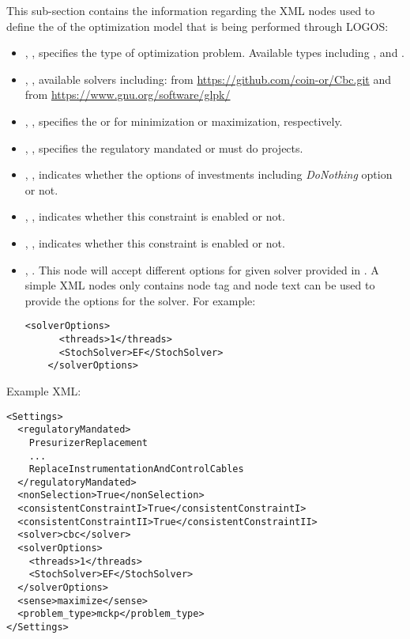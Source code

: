 This sub-section contains the information regarding the XML nodes used to define the
 of the optimization model that is being performed through LOGOS:
\begin{itemize}
  \item {}, , specifies the type of
  optimization problem. Available types including ,
   and .
  \item {}, , available solvers including:
   from \url{https://github.com/coin-or/Cbc.git} and  from
  \url{https://www.gnu.org/software/glpk/}
  \item {}, , specifies the 
  or  for minimization or maximization, respectively.
  \item {}, ,
  specifies the regulatory mandated or must do projects.
  \item {}, , indicates whether the
  options of investments including \textit{DoNothing} option or not.
  \item {}, , indicates whether
  this constraint is enabled or not.
  \item {}, , indicates whether
  this constraint is enabled or not.
  \item {}, . This node will accept
  different options for given solver provided in . A simple XML nodes only contains
  node tag and node text can be used to provide the options for the solver. For example:
  \begin{lstlisting}[style=XML]
    <solverOptions>
      <threads>1</threads>
      <StochSolver>EF</StochSolver>
    </solverOptions>
  \end{lstlisting}
\end{itemize}

Example XML:
\begin{lstlisting}[style=XML]
<Settings>
  <regulatoryMandated>
    PresurizerReplacement
    ...
    ReplaceInstrumentationAndControlCables
  </regulatoryMandated>
  <nonSelection>True</nonSelection>
  <consistentConstraintI>True</consistentConstraintI>
  <consistentConstraintII>True</consistentConstraintII>
  <solver>cbc</solver>
  <solverOptions>
    <threads>1</threads>
    <StochSolver>EF</StochSolver>
  </solverOptions>
  <sense>maximize</sense>
  <problem_type>mckp</problem_type>
</Settings>
\end{lstlisting}
